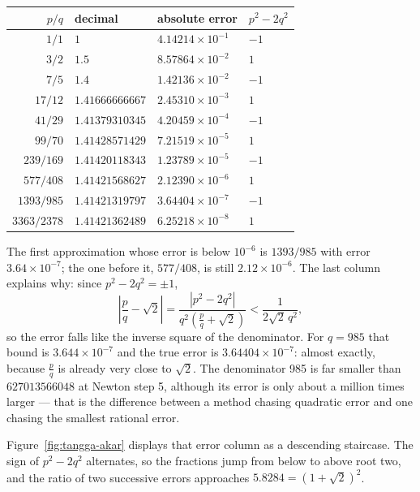 \begin{center}\small
\begin{tabular}{rlll}
\hline
$p/q$ & decimal & absolute error & $p^2-2q^2$ \\
\hline
$1/1$ & $1$ & $4.14214\times10^{-1}$ & $-1$ \\
$3/2$ & $1.5$ & $8.57864\times10^{-2}$ & $1$ \\
$7/5$ & $1.4$ & $1.42136\times10^{-2}$ & $-1$ \\
$17/12$ & $1.41666666667$ & $2.45310\times10^{-3}$ & $1$ \\
$41/29$ & $1.41379310345$ & $4.20459\times10^{-4}$ & $-1$ \\
$99/70$ & $1.41428571429$ & $7.21519\times10^{-5}$ & $1$ \\
$239/169$ & $1.41420118343$ & $1.23789\times10^{-5}$ & $-1$ \\
$577/408$ & $1.41421568627$ & $2.12390\times10^{-6}$ & $1$ \\
$1393/985$ & $1.41421319797$ & $3.64404\times10^{-7}$ & $-1$ \\
$3363/2378$ & $1.41421362489$ & $6.25218\times10^{-8}$ & $1$ \\
\hline
\end{tabular}
\end{center}

The first approximation whose error is below $10^{-6}$ is $1393/985$ with error
$3.64\times10^{-7}$; the one before it, $577/408$, is still $2.12\times10^{-6}$. The last
column explains why: since $p^2-2q^2=\pm1$,
\[
\left|\frac pq-\sqrt2\right|
=\frac{|p^2-2q^2|}{q^2\left(\frac pq+\sqrt2\right)}
<\frac{1}{2\sqrt2\,q^2},
\]
so the error falls like the inverse square of the denominator. For $q=985$ that bound is
$3.644\times10^{-7}$ and the true error is $3.64404\times10^{-7}$: almost exactly,
because $\frac pq$ is already very close to $\sqrt2$. The denominator 985 is far smaller
than $627013566048$ at Newton step 5, although its error is only about a million times
larger --- that is the difference between a method chasing quadratic error and one
chasing the smallest rational error.

Figure~\ref{fig:tangga-akar} displays that error column as a descending staircase. The
sign of $p^2-2q^2$ alternates, so the fractions jump from below to above root two, and
the ratio of two successive errors approaches $5.8284=(1+\sqrt2)^2$.


